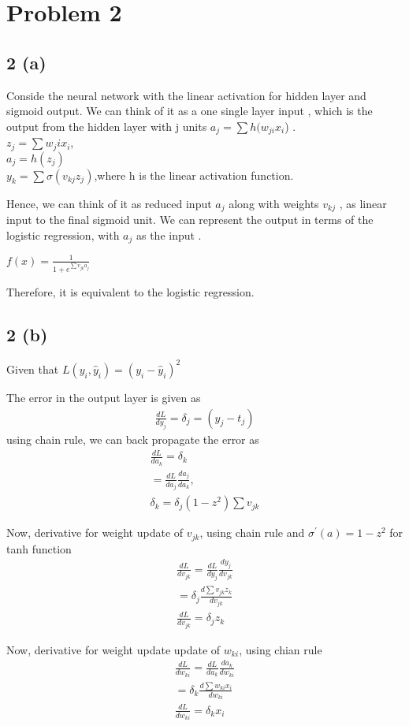 \documentclass[10pt,letterpaper]{article}
\begin{document}
\section{Problem 2}
\subsection{2 (a) }
Conside the neural network with the linear activation for hidden layer and sigmoid output. We can think of it as a one single layer input , which is the output from the hidden layer with j units $a_j = \sum h( w_{ji} x_i$) . \\
$z_j=\sum w_ji x_i$, \\
$a_j=h(z_j)$ \\
$y_k=\sum \sigma (v_{kj} z_j) $,where  h is the linear activation function.

Hence, we can think of it as reduced input $a_j$ along with weights $v_{kj}$ , as linear input to the final sigmoid unit. We can represent the output in terms of the logistic regression, with $a_j$ as the input .

$f(x) = \frac{1}{ 1 + e^{\sum v_{jk} a_j}}$

Therefore, it is equivalent to the logistic regression.  

\subsection{2 (b) }
Given that $ L(y_i,\hat y_i) = (y_i - \hat y_i)^2$

The error in the output layer is given as 
\begin{align*}
	\frac{dL}{d y_j}=\delta_j = (y_j -t _j)
\end{align*}
 using chain rule, we can back propagate the error as
\begin{align*}
	\frac{dL}{d a_k}=\delta_k\\
	=\frac{dL}{d a_j}\frac{d a_j}{d a_k} , \\
\delta_k=\delta_j (1-z^2) \sum v_{jk}
\end{align*}

Now, derivative for weight update of $v_{jk}$, using chain rule and $\sigma^{'} (a)= 1-z^2 $ for tanh function 
\begin{align*}
	\frac{dL}{d v_{jk}}=\frac{dL}{d y_{j}} \frac{d y_j}{d v_{jk}}	\\
	=\delta_j \frac{d\sum v_{jk}z_k}{ d v_{jk}}\\
\frac{dL}{d v_{jk}}=\delta_j z_k
\end{align*}

Now, derivative for weight update update of $w_{ki}$, using chian rule
\begin{align*}
	\frac{dL}{d w_{ki}}=\frac{dL}{d a_{k}} \frac{d a_k}{d w_{ki}}	\\
	=\delta_k \frac{d\sum w_{ki} x_i}{ d w_{ki}}\\
\frac{dL}{d w_{ki}}=\delta_k x_i
\end{align*}
 
\end{document}
